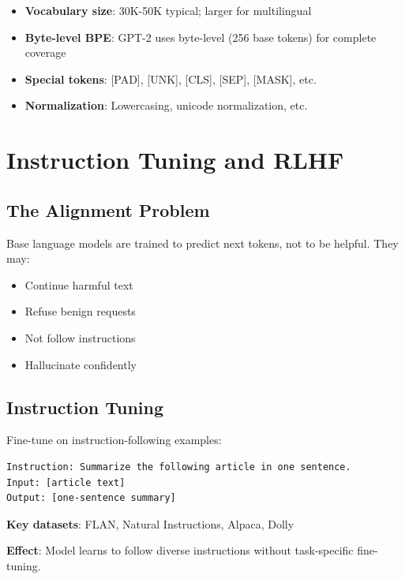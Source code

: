 \begin{itemize}
    \item \textbf{Vocabulary size}: 30K-50K typical; larger for multilingual
    \item \textbf{Byte-level BPE}: GPT-2 uses byte-level (256 base tokens) for complete coverage
    \item \textbf{Special tokens}: [PAD], [UNK], [CLS], [SEP], [MASK], etc.
    \item \textbf{Normalization}: Lowercasing, unicode normalization, etc.
\end{itemize}

\section{Instruction Tuning and RLHF}
\label{sec:instruction_tuning}

\subsection{The Alignment Problem}

Base language models are trained to predict next tokens, not to be helpful. They may:
\begin{itemize}
    \item Continue harmful text
    \item Refuse benign requests
    \item Not follow instructions
    \item Hallucinate confidently
\end{itemize}

\subsection{Instruction Tuning}

Fine-tune on instruction-following examples:
\begin{verbatim}
Instruction: Summarize the following article in one sentence.
Input: [article text]
Output: [one-sentence summary]
\end{verbatim}

\textbf{Key datasets}: FLAN, Natural Instructions, Alpaca, Dolly

\textbf{Effect}: Model learns to follow diverse instructions without task-specific fine-tuning.

